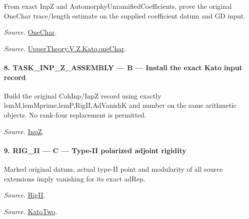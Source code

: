 From exact InpZ and AutomorphyUnramifiedCoefficients, prove the original OneChar trace/length estimate on the supplied coefficient datum and GD input.

\emph{Source.} \href{https://github.com/CocoSgt/riemann-hypothesis-lean/blob/7cbf7a0c32fca1badf05931879a37c3f8a2b03b4/src/Development/AutomorphicArithmetic/AutomorphicVarieties/UnitaryThreeGroups/KatoUse.lean#L54-L64}{OneChar}.

\emph{Source.} \href{https://github.com/CocoSgt/riemann-hypothesis-lean/blob/7cbf7a0c32fca1badf05931879a37c3f8a2b03b4/src/Development/AutomorphicArithmetic/AutomorphicVarieties/ModularityArgument/KatoQuadraticCharacters/OneChar.lean#L158-L178}{UpperTheory.V.Z.Kato.oneChar}.



\paragraph{8. TASK\_\allowbreak INP\_\allowbreak Z\_\allowbreak ASSEMBLY — B — Install the exact Kato input record}

Build the original CohInp/InpZ record using exactly lemM,lemMprime,lemP,RigII,AdVanishK and number on the same arithmetic objects. No rank-four replacement is permitted.

\emph{Source.} \href{https://github.com/CocoSgt/riemann-hypothesis-lean/blob/7cbf7a0c32fca1badf05931879a37c3f8a2b03b4/src/Development/AutomorphicArithmetic/AutomorphicVarieties/ModularityArgument/KatoQuadraticCharacters/KatoTwoOfUseN.lean#L55-L61}{InpZ}.



\paragraph{9. RIG\_\allowbreak II — C — Type-II polarized adjoint rigidity}

Marked original datum, actual type-II point and modularity of all source extensions imply vanishing for its exact adRep.

\emph{Source.} \href{https://github.com/CocoSgt/riemann-hypothesis-lean/blob/7cbf7a0c32fca1badf05931879a37c3f8a2b03b4/src/Development/AutomorphicArithmetic/AutomorphicVarieties/ModularityArgument/KatoQuadraticCharacters/KatoTwoOfUseN.lean#L49-L53}{RigII}.

\emph{Source.} \href{https://github.com/CocoSgt/riemann-hypothesis-lean/blob/7cbf7a0c32fca1badf05931879a37c3f8a2b03b4/src/Development/AutomorphicArithmetic/AutomorphicVarieties/ModularityArgument/KatoQuadraticCharacters/KatoTwoOfUseN.lean#L43-L47}{KatoTwo}.

